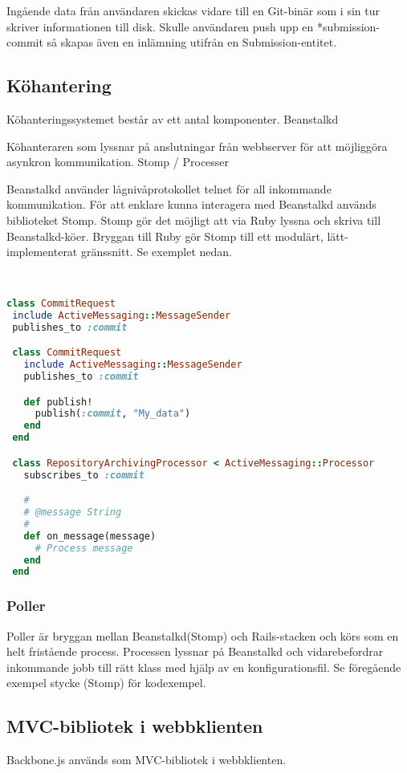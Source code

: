 Ingående data från användaren skickas vidare till en Git-binär som i sin tur skriver informationen till disk. Skulle användaren push upp en *submission-commit så skapas även en inlämning utifrån en Submission-entitet.
\subsection{Köhantering}
Köhanteringssystemet består av ett antal komponenter.
Beanstalkd

Köhanteraren som lyssnar på anslutningar från webbserver för att möjliggöra asynkron kommunikation.
Stomp / Processer

Beanstalkd använder lågnivåprotokollet telnet för all inkommande kommunikation. För att enklare kunna interagera med Beanstalkd används biblioteket Stomp. Stomp gör det möjligt att via Ruby lyssna och skriva till Beanstalkd-köer. Bryggan till Ruby gör Stomp till ett modulärt, lätt-implementerat gränssnitt. Se exemplet nedan.

\begin{lstlisting}[language=Ruby]


class CommitRequest
 include ActiveMessaging::MessageSender
 publishes_to :commit

 class CommitRequest
   include ActiveMessaging::MessageSender
   publishes_to :commit

   def publish!
     publish(:commit, "My_data")
   end
 end

 class RepositoryArchivingProcessor < ActiveMessaging::Processor
   subscribes_to :commit

   #
   # @message String
   #
   def on_message(message)
     # Process message
   end
 end
\end{lstlisting}

\subsubsection{Poller}

Poller är bryggan mellan Beanstalkd(Stomp) och Rails-stacken och körs som en helt fristående process. Processen lyssnar på Beanstalkd och vidarebefordrar inkommande jobb till rätt klass med hjälp av en konfigurationsfil. Se föregående exempel stycke (Stomp) för kodexempel.

\subsection{MVC-bibliotek i webbklienten}
Backbone.js används som MVC-bibliotek i webbklienten.

